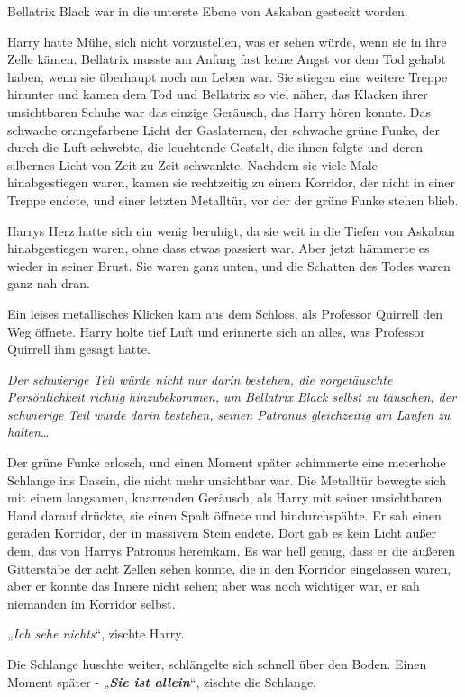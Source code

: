 {Bellatrix Black war in die unterste Ebene von Askaban gesteckt worden.

Harry hatte Mühe, sich nicht vorzustellen, was er sehen würde, wenn sie in ihre Zelle kämen. Bellatrix musste am Anfang fast keine Angst vor dem Tod gehabt haben, wenn sie überhaupt noch am Leben war. Sie stiegen eine weitere Treppe hinunter und kamen dem Tod und Bellatrix so viel näher, das Klacken ihrer unsichtbaren Schuhe war das einzige Geräusch, das Harry hören konnte. Das schwache orangefarbene Licht der Gaslaternen, der schwache grüne Funke, der durch die Luft schwebte, die leuchtende Gestalt, die ihnen folgte und deren silbernes Licht von Zeit zu Zeit schwankte. Nachdem sie viele Male hinabgestiegen waren, kamen sie rechtzeitig zu einem Korridor, der nicht in einer Treppe endete, und einer letzten Metalltür, vor der der grüne Funke stehen blieb.

Harrys Herz hatte sich ein wenig beruhigt, da sie weit in die Tiefen von Askaban hinabgestiegen waren, ohne dass etwas passiert war. Aber jetzt hämmerte es wieder in seiner Brust. Sie waren ganz unten, und die Schatten des Todes waren ganz nah dran.

Ein leises metallisches Klicken kam aus dem Schloss, als Professor Quirrell den Weg öffnete. Harry holte tief Luft und erinnerte sich an alles, was Professor Quirrell ihm gesagt hatte.

\emph{Der schwierige Teil würde nicht nur darin bestehen, die vorgetäuschte Persönlichkeit richtig hinzubekommen, um Bellatrix Black selbst zu täuschen, der schwierige Teil würde darin bestehen, seinen Patronus gleichzeitig am Laufen zu halten…}

Der grüne Funke erlosch, und einen Moment später schimmerte eine meterhohe Schlange ins Dasein, die nicht mehr unsichtbar war. Die Metalltür bewegte sich mit einem langsamen, knarrenden Geräusch, als Harry mit seiner unsichtbaren Hand darauf drückte, sie einen Spalt öffnete und hindurchspähte. Er sah einen geraden Korridor, der in massivem Stein endete. Dort gab es kein Licht außer dem, das von Harrys Patronus hereinkam. Es war hell genug, dass er die äußeren Gitterstäbe der acht Zellen sehen konnte, die in den Korridor eingelassen waren, aber er konnte das Innere nicht sehen; aber was noch wichtiger war, er sah niemanden im Korridor selbst.

„\emph{Ich sehe nichts}“, zischte Harry.

Die Schlange huschte weiter, schlängelte sich schnell über den Boden. Einen Moment später - „\textbf{\emph{Sie ist allein}}“, zischte die Schlange.

}
